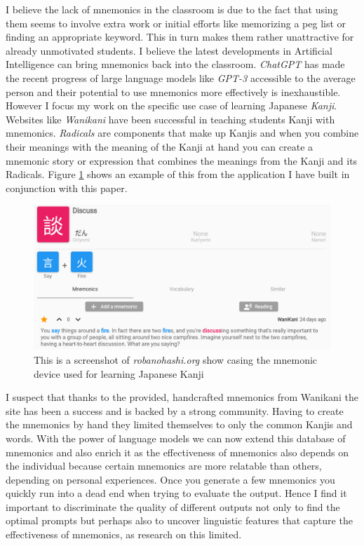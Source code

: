 I believe the lack of mnemonics in the classroom is due to the fact that using them seems to involve extra work or initial efforts like memorizing a peg list or finding an appropriate keyword. This in turn makes them rather unattractive for already unmotivated students.
I believe the latest developments in Artificial Intelligence can bring mnemonics back into the classroom. \emph{ChatGPT} has made the recent progress of large language models like \emph{GPT-3} accessible to the average person and their potential to use mnemonics more effectively is inexhaustible. However I focus my work on the specific use case of learning Japanese \emph{Kanji}. Websites like \emph{Wanikani} \cite{wanikani} have been successful in teaching students Kanji with mnemonics. \emph{Radicals} are components that make up Kanjis and when you combine their meanings with the meaning of the Kanji at hand you can create a mnemonic story or expression that combines the meanings from the Kanji and its Radicals. Figure \ref{figure:robanohashi_example} shows an example of this from the application I have built in conjunction with this paper.
\begin{figure}
    \centering
    \includegraphics[width=400pt]{resources/robanohashi_example.png}
    \caption{This is a screenshot of \emph{robanohashi.org} show casing the mnemonic device used for learning Japanese Kanji}
    \label{figure:robanohashi_example}
\end{figure}
I suspect that thanks to the provided, handcrafted mnemonics from Wanikani the site has been a success and is backed by a strong community. Having to create the mnemonics by hand they limited themselves to only the common Kanjis and words. With the power of language models we can now extend this database of mnemonics and also enrich it as the effectiveness of mnemonics also depends on the individual because certain mnemonics are more relatable than others, depending on personal experiences. Once you generate a few mnemonics you quickly run into a dead end when trying to evaluate the output. Hence I find it important to discriminate the quality of different outputs not only to find the optimal prompts but perhaps also to uncover linguistic features that capture the effectiveness of mnemonics, as research on this limited. 

